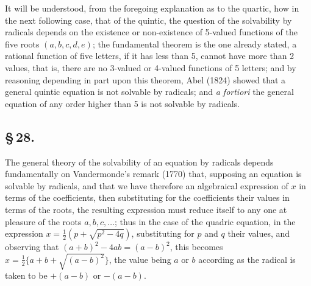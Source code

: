 \documentclass[11pt,a4paper]{book}
\begin{document}
It will be understood, from the foregoing explanation as to the quartic, how in the next following case, that of the quintic, the question of the solvability by radicals depends on the existence or non-existence of 5-valued functions of the five roots $(a, b, c, d, e)$; the fundamental theorem is the one already stated, a rational function of five letters, if it has less than 5, cannot have more than 2 values, that is, there are no 3-valued or 4-valued functions of 5 letters; and by reasoning depending in part upon this theorem, Abel (1824) showed that a general quintic equation is not solvable by radicals; and \textit{a fortiori} the general equation of any order higher than 5 is not solvable by radicals.

\subsection*{\S\,28.}

The general theory of the solvability of an equation by radicals depends fundamentally on Vandermonde's remark (1770) that, supposing an equation is solvable by radicals, and that we have therefore an algebraical expression of $x$ in terms of the coefficients, then substituting for the coefficients their values in terms of the roots, the resulting expression must reduce itself to any one at pleasure of the roots $a, b, c, \ldots$; thus in the case of the quadric equation, in the expression $x = \frac{1}{2}(p + \sqrt{p^{2} - 4q})$, substituting for $p$ and $q$ their values, and observing that $(a + b)^{2} - 4ab = (a - b)^{2}$, this becomes $x = \frac{1}{2}\{a + b + \sqrt{(a - b)^{2}}\}$, the value being $a$ or $b$ according as the radical is taken to be $+(a - b)$ or $-(a - b)$.
\end{document}
